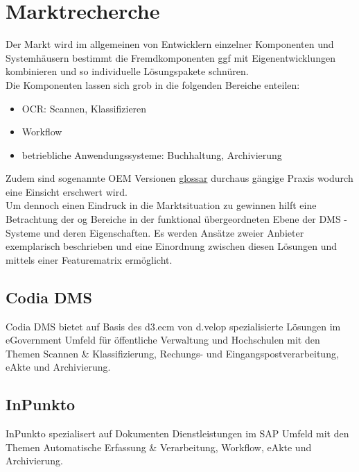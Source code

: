 \chapter{Marktrecherche}

\begin{comment}
Die Marktrecherche, auch related works genannt, beinhaltet die Recherche nach konkurrierenden Systemen, die teilweise oder vollständig die Funktionalitäten aufweisen wie sie für das zu entwickelte System geplant sind. Dabei sollte man Vor- und Nachteile gegenüber dem zu entwickelten System herausstellen. 
\end{comment}

Der Markt wird im allgemeinen von Entwicklern einzelner Komponenten und Systemhäusern bestimmt die Fremdkomponenten ggf mit Eigenentwicklungen kombinieren und so individuelle Lösungspakete schnüren.\\
Die Komponenten lassen sich grob in die folgenden Bereiche enteilen:
\begin{itemize}
\item OCR: Scannen, Klassifizieren
\item Workflow
\item betriebliche Anwendungssysteme: Buchhaltung, Archivierung
\end{itemize}
\noindent
Zudem sind sogenannte OEM Versionen \href{}{glossar} durchaus gängige Praxis wodurch eine Einsicht erschwert wird.\\
Um dennoch einen Eindruck in die Marktsituation zu gewinnen hilft eine Betrachtung der og Bereiche in der funktional übergeordneten Ebene der DMS -Systeme und deren Eigenschaften. Es werden Ansätze zweier Anbieter exemplarisch beschrieben und eine Einordnung zwischen diesen Lösungen und \brand mittels einer Featurematrix ermöglicht.


\section{Codia DMS }
%
%
Codia DMS bietet auf Basis des d3.ecm von d.velop spezialisierte Lösungen im eGovernment Umfeld für öffentliche Verwaltung und Hochschulen mit den Themen Scannen & Klassifizierung, Rechungs- und Eingangspostverarbeitung, eAkte und Archivierung.


\section{InPunkto}
InPunkto spezialisert auf Dokumenten Dienstleistungen im SAP Umfeld mit den Themen Automatische Erfassung \& Verarbeitung, Workflow, 
eAkte und Archivierung.


